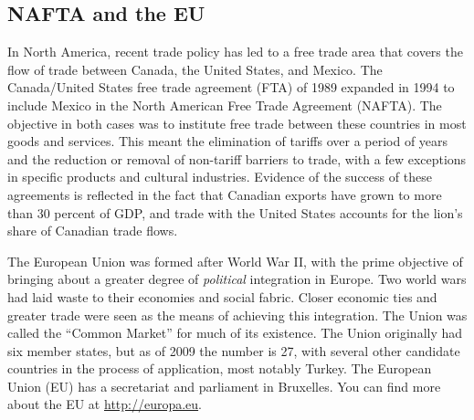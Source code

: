 \subsection*{NAFTA and the EU}

In North America, recent trade policy has led to a free trade area that covers the flow of trade between Canada, the United States, and Mexico. The Canada/United States free trade agreement (FTA) of 1989 expanded in 1994 to include Mexico in the North American Free Trade Agreement (NAFTA). The objective in both cases was to institute free trade between these countries in most goods and services. This meant the elimination of tariffs over a period of years and the reduction or removal of non-tariff barriers to trade, with a few exceptions in specific products and cultural industries. Evidence of the success of these agreements is reflected in the fact that Canadian exports have grown to more than 30 percent of GDP, and trade with the United States accounts for the lion's share of Canadian trade flows.

The European Union was formed after World War II, with the prime objective of bringing about a greater degree of \textit{political} integration in Europe. Two world wars had laid waste to their economies and social fabric. Closer economic ties and greater trade were seen as the means of achieving this integration. The Union was called the ``Common Market'' for much of its existence. The Union originally had six member states, but as of 2009 the number is 27, with several other candidate countries in the process of application, most notably Turkey. The European Union (EU) has a secretariat and parliament in Bruxelles. You can find more about the EU at \url{http://europa.eu}.